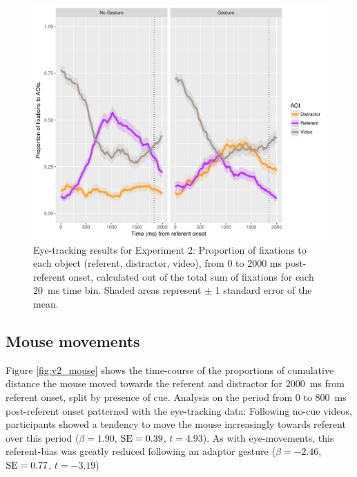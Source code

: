 \documentclass[a4paper,man,natbib]{apa6}
\newcommand{\resultsLM}[3]{$\beta = #1$, $\textnormal{SE} = #2$, $t #3$}
\begin{document}
\begin{figure}[Ht]
  \centering
	\includegraphics[width=\linewidth]{./img/e8_fixations.pdf}
  \caption{Eye-tracking results for Experiment 2: Proportion of fixations to each object (referent, distractor, video), from 0 to 2000 ms post-referent onset, calculated out of the total sum of fixations for each 20~ms time bin. Shaded areas represent $\pm$ 1 standard error of the mean.}
  \label{fig:v2_eye}
\end{figure}

\subsection{Mouse movements}
Figure \ref{fig:v2_mouse} shows the time-course of the proportions of cumulative distance the mouse moved towards the referent and distractor for 2000~ms from referent onset, split by presence of cue.
Analysis on the period from 0 to 800~ms post-referent onset patterned with the eye-tracking data:
Following no-cue videos, participants showed a tendency to move the mouse increasingly towards referent over this period (\resultsLM{1.90}{0.39}{=4.93}).
As with eye-movements, this referent-bias was greatly reduced following an adaptor gesture (\resultsLM{-2.46}{0.77}{=-3.19})
\end{document}

